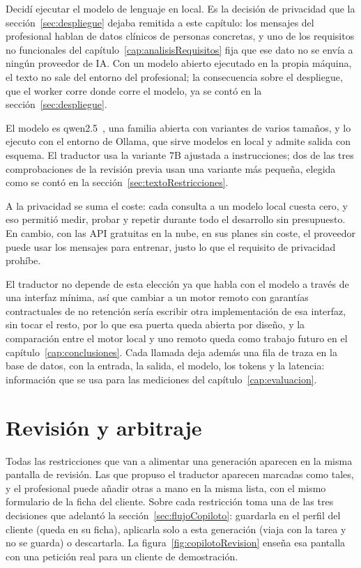 Decidí ejecutar el modelo de lenguaje en local. Es la decisión de privacidad que la sección~\ref{sec:despliegue} dejaba remitida a este capítulo: los mensajes del profesional hablan de datos clínicos de personas concretas, y uno de los requisitos no funcionales del capítulo~\ref{cap:analisisRequisitos} fija que ese dato no se envía a ningún proveedor de IA. Con un modelo abierto ejecutado en la propia máquina, el texto no sale del entorno del profesional; la consecuencia sobre el despliegue, que el worker corre donde corre el modelo, ya se contó en la sección~\ref{sec:despliegue}.

El modelo es qwen2.5~\citep{qwen25}, una familia abierta con variantes de varios tamaños, y lo ejecuto con el entorno de Ollama, que sirve modelos en local y admite salida con esquema. El traductor usa la variante 7B ajustada a instrucciones; dos de las tres comprobaciones de la revisión previa usan una variante más pequeña, elegida como se contó en la sección~\ref{sec:textoRestricciones}.

A la privacidad se suma el coste: cada consulta a un modelo local cuesta cero, y eso permitió medir, probar y repetir durante todo el desarrollo sin presupuesto. En cambio, con las API gratuitas en la nube, en sus planes sin coste, el proveedor puede usar los mensajes para entrenar, justo lo que el requisito de privacidad prohíbe.

El traductor no depende de esta elección ya que habla con el modelo a través de una interfaz mínima, así que cambiar a un motor remoto con garantías contractuales de no retención sería escribir otra implementación de esa interfaz, sin tocar el resto, por lo que esa puerta queda abierta por diseño, y la comparación entre el motor local y uno remoto queda como trabajo futuro en el capítulo~\ref{cap:conclusiones}. Cada llamada deja además una fila de traza en la base de datos, con la entrada, la salida, el modelo, los tokens y la latencia: información que se usa para las mediciones del capítulo~\ref{cap:evaluacion}.

\section{Revisión y arbitraje}
\label{sec:arbitraje}

Todas las restricciones que van a alimentar una generación aparecen en la misma pantalla de revisión. Las que propuso el traductor aparecen marcadas como tales, y el profesional puede añadir otras a mano en la misma lista, con el mismo formulario de la ficha del cliente. Sobre cada restricción toma una de las tres decisiones que adelantó la sección~\ref{sec:flujoCopiloto}: guardarla en el perfil del cliente (queda en su ficha), aplicarla solo a esta generación (viaja con la tarea y no se guarda) o descartarla. La figura~\ref{fig:copilotoRevision} enseña esa pantalla con una petición real para un cliente de demostración.


